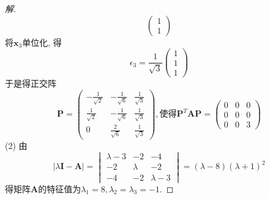 \documentclass[10pt,a4paper]{report}
\def\*#1{\mathbf{#1}}
\begin{document}
\begin{proof}[解]
\[\begin{pmatrix}
	1 \\
	1
	\end{pmatrix}\]
	将$\*x_3$单位化, 得
	\[\epsilon_3 = \frac{1}{\sqrt{3}}\begin{pmatrix}
	1 \\
	1 \\
	1
	\end{pmatrix}\]
	于是得正交阵
	\[ \*P = \begin{pmatrix}
	-\frac{1}{\sqrt{2}} & -\frac{1}{\sqrt{6}} & \frac{1}{\sqrt{3}} \\
	\frac{1}{\sqrt{2}} & -\frac{1}{\sqrt{6}} & \frac{1}{\sqrt{3}} \\
	0 & \frac{2}{\sqrt{6}} & \frac{1}{\sqrt{3}}
	\end{pmatrix}, \text{使得}\*P^T\*A\*P = \begin{pmatrix}
	0 & 0 & 0 \\
	0 & 0 & 0 \\
	0 & 0 & 3
	\end{pmatrix} \]
	(2) 由
	\[|\lambda\*I - \*A| = \begin{vmatrix}
	\lambda-3 & -2 & -4 \\
	-2 & \lambda & -2 \\
	-4 & -2 & \lambda-3
	\end{vmatrix} = (\lambda-8)(\lambda+1)^2\]
	得矩阵$\*A$的特征值为$\lambda_1 = 8, \lambda_2 = \lambda_3 = -1$.
	

\end{proof}
\end{document}
